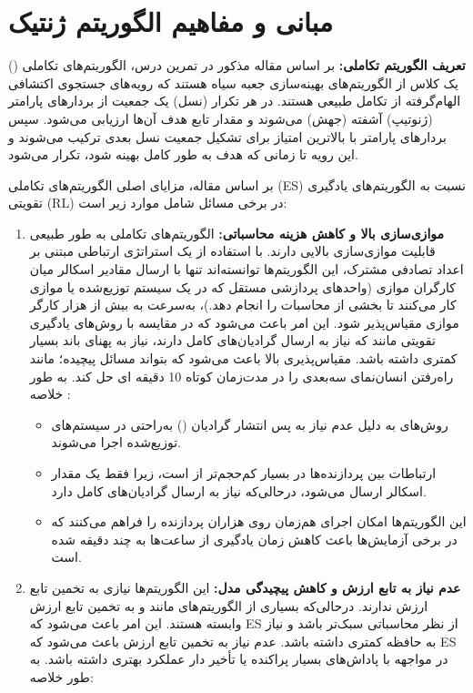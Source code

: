 \documentclass[12pt]{exam}
\begin{document}
	\section{مبانی و مفاهیم الگوریتم ژنتیک}
	\begin{questions}
		\question
		\textbf{ 
			تعریف الگوریتم تکاملی: }
		بر اساس مقاله مذکور در تمرین درس، الگوریتم‌های تکاملی 
		()
		یک کلاس از الگوریتم‌های بهینه‌سازی جعبه سیاه هستند که رویه‌های جستجوی اکتشافی الهام‌گرفته از تکامل طبیعی هستند. در هر تکرار (نسل) یک جمعیت از بردارهای پارامتر (ژنوتیپ) آشفته (جهش) می‌شوند و مقدار تابع هدف 
		آن‌ها ارزیابی می‌شود. سپس بردارهای پارامتر با بالاترین امتیاز برای تشکیل جمعیت نسل بعدی ترکیب می‌شوند و این رویه تا زمانی که هدف به طور کامل بهینه شود، تکرار می‌شود.
		
		بر اساس مقاله، مزایای اصلی الگوریتم‌های تکاملی (ES) نسبت به الگوریتم‌های یادگیری تقویتی (RL) در برخی مسائل شامل موارد زیر است:
		\begin{enumerate}
			\item \textbf{
				موازی‌سازی بالا و کاهش هزینه محاسباتی:}
			الگوریتم‌های تکاملی به طور طبیعی قابلیت موازی‌سازی بالایی دارند. با استفاده از یک استراتژی ارتباطی مبتنی بر اعداد تصادفی مشترک، این الگوریتم‌ها توانسته‌اند تنها با ارسال مقادیر اسکالر میان کارگران موازی (واحدهای پردازشی مستقل که در یک سیستم توزیع‌شده یا موازی کار می‌کنند تا بخشی از محاسبات را انجام دهد.)، به‌سرعت به بیش از هزار کارگر موازی مقیاس‌پذیر شود. این امر باعث می‌شود که
			در مقایسه با روش‌های یادگیری تقویتی مانند
			که نیاز به ارسال گرادیان‌های کامل دارند، نیاز به پهنای باند بسیار کمتری داشته باشد. مقیاس‌پذیری بالا باعث می‌شود که
			بتواند مسائل پیچیده؛ مانند راه‌رفتن انسان‌نمای سه‌بعدی را در مدت‌زمان کوتاه 10 دقیقه ای حل کند. به طور خلاصه :
			\begin{itemize}
				\item  
				روش‌های
				به دلیل عدم نیاز به پس انتشار گرادیان 
				()
				به‌راحتی در سیستم‌های توزیع‌شده اجرا می‌شوند.
				\item 
				ارتباطات بین پردازنده‌ها در
				بسیار کم‌حجم‌تر از
				است، زیرا فقط یک مقدار اسکالر ارسال می‌شود، درحالی‌که
				نیاز به ارسال گرادیان‌های کامل دارد.
				\item 
				این الگوریتم‌ها امکان اجرای هم‌زمان روی هزاران پردازنده را فراهم می‌کنند که در برخی آزمایش‌ها باعث کاهش زمان یادگیری از ساعت‌ها به چند دقیقه شده است.
				
			\end{itemize}
			\item \textbf{
				عدم نیاز به تابع ارزش 
				و کاهش پیچیدگی مدل: 
			}
			این الگوریتم‌ها نیازی به تخمین تابع ارزش ندارند. درحالی‌که بسیاری از الگوریتم‌های
			 مانند
			 و 
			به تخمین تابع ارزش وابسته هستند. این امر باعث می‌شود که ES از نظر محاسباتی سبک‌تر باشد و نیاز به حافظه کمتری داشته باشد. عدم نیاز به تخمین تابع ارزش باعث می‌شود که ES در مواجهه با پاداش‌های بسیار پراکنده یا تأخیر دار عملکرد بهتری داشته باشد. به طور خلاصه:
			\begin{itemize}
				

\end{itemize}
\end{enumerate}
\end{questions}
\end{document}
